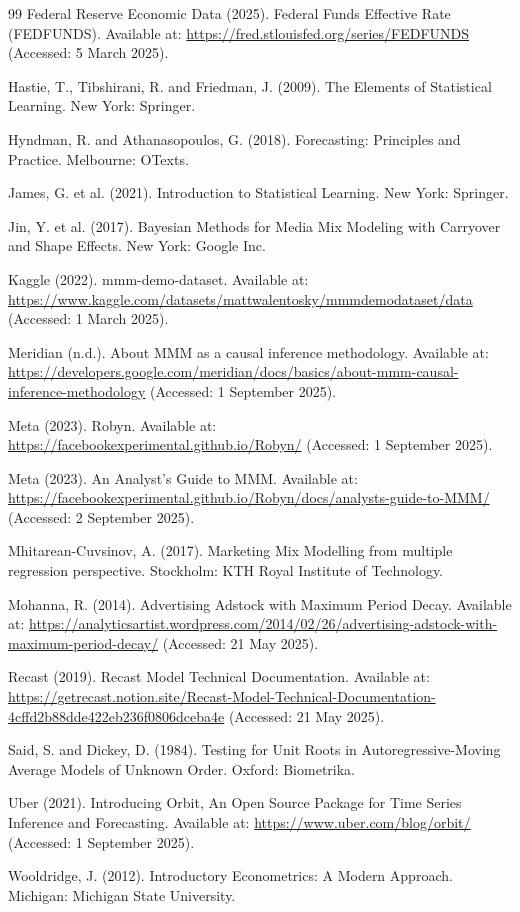 \documentclass[11pt, a4paper]{article}
\begin{document}
\begin{thebibliography}{99}
Federal Reserve Economic Data (2025). Federal Funds Effective Rate (FEDFUNDS). Available at: \url{https://fred.stlouisfed.org/series/FEDFUNDS} (Accessed: 5 March 2025).

Hastie, T., Tibshirani, R. and Friedman, J. (2009). The Elements of Statistical Learning. New York: Springer.

Hyndman, R. and Athanasopoulos, G. (2018). Forecasting: Principles and Practice. Melbourne: OTexts.

James, G. et al. (2021). Introduction to Statistical Learning. New York: Springer.

Jin, Y. et al. (2017). Bayesian Methods for Media Mix Modeling with Carryover and Shape Effects. New York: Google Inc.

Kaggle (2022). mmm-demo-dataset. Available at: \url{https://www.kaggle.com/datasets/mattwalentosky/mmmdemodataset/data} (Accessed: 1 March 2025).

Meridian (n.d.). About MMM as a causal inference methodology. Available at: \url{https://developers.google.com/meridian/docs/basics/about-mmm-causal-inference-methodology} (Accessed: 1 September 2025).

Meta (2023). Robyn. Available at: \url{https://facebookexperimental.github.io/Robyn/} (Accessed: 1 September 2025).

Meta (2023). An Analyst's Guide to MMM. Available at: \url{https://facebookexperimental.github.io/Robyn/docs/analysts-guide-to-MMM/} (Accessed: 2 September 2025).

Mhitarean-Cuvsinov, A. (2017). Marketing Mix Modelling from multiple regression perspective. Stockholm: KTH Royal Institute of Technology.

Mohanna, R. (2014). Advertising Adstock with Maximum Period Decay. Available at: \url{https://analyticsartist.wordpress.com/2014/02/26/advertising-adstock-with-maximum-period-decay/} (Accessed: 21 May 2025).

Recast (2019). Recast Model Technical Documentation. Available at: \url{https://getrecast.notion.site/Recast-Model-Technical-Documentation-4cffd2b88dde422eb236f0806dceba4e} (Accessed: 21 May 2025).

Said, S. and Dickey, D. (1984). Testing for Unit Roots in Autoregressive-Moving Average Models of Unknown Order. Oxford: Biometrika.

Uber (2021). Introducing Orbit, An Open Source Package for Time Series Inference and Forecasting. Available at: \url{https://www.uber.com/blog/orbit/} (Accessed: 1 September 2025).

Wooldridge, J. (2012). Introductory Econometrics: A Modern Approach. Michigan: Michigan State University.

\end{thebibliography}
\end{document}
